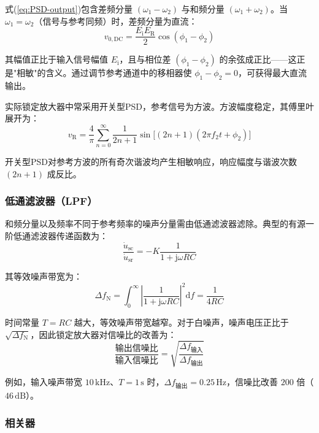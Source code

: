 式(\ref{eq:PSD-output})包含差频分量 $(\omega_{1} - \omega_{2})$ 与和频分量 $(\omega_{1} + \omega_{2})$。当 $\omega_{1} = \omega_{2}$（信号与参考同频）时，差频分量为直流：
\begin{equation}
v_{0,\mathrm{DC}} = \frac{E_{\mathrm{i}}E_{\mathrm{R}}}{2}\cos(\phi_{1} - \phi_{2})
\end{equation}

其幅值正比于输入信号幅值 $E_{\mathrm{i}}$，且与相位差 $(\phi_{1} - \phi_{2})$ 的余弦成正比——这正是"相敏"的含义。通过调节参考通道中的移相器使 $\phi_{1} - \phi_{2} = 0$，可获得最大直流输出。

实际锁定放大器中常采用开关型PSD，参考信号为方波。方波幅度稳定，其傅里叶展开为：
\begin{equation}
v_{\mathrm{R}} = \frac{4}{\pi}\sum_{n=0}^{\infty}\frac{1}{2n+1}\sin\big[(2n+1)(2\pi f_{2}t + \phi_{2})\big]
\end{equation}

开关型PSD对参考方波的所有奇次谐波均产生相敏响应，响应幅度与谐波次数 $(2n+1)$ 成反比。

\subsubsection{低通滤波器（LPF）}

和频分量以及频率不同于参考频率的噪声分量需由低通滤波器滤除。典型的有源一阶低通滤波器传递函数为：
\begin{equation}
\frac{\dot{u}_{\mathrm{sc}}}{\dot{u}_{\mathrm{sr}}} = -K\frac{1}{1 + \mathrm{j}\omega RC}
\end{equation}

其等效噪声带宽为：
\begin{equation}\label{eq:noise-bandwidth}
\Delta f_{\mathrm{N}} = \int_{0}^{\infty}\left|\frac{1}{1 + \mathrm{j}\omega RC}\right|^{2}\mathrm{d}f = \frac{1}{4RC}
\end{equation}

时间常量 $T = RC$ 越大，等效噪声带宽越窄。对于白噪声，噪声电压正比于 $\sqrt{\Delta f_{\mathrm{N}}}$，因此锁定放大器对信噪比的改善为：
\begin{equation}
\frac{\text{输出信噪比}}{\text{输入信噪比}} = \sqrt{\frac{\Delta f_{\text{输入}}}{\Delta f_{\text{输出}}}}
\end{equation}

例如，输入噪声带宽 $10\,\mathrm{kHz}$、$T = 1\,\mathrm{s}$ 时，$\Delta f_{\text{输出}} = 0.25\,\mathrm{Hz}$，信噪比改善 $200$ 倍（$46\,\mathrm{dB}$）。

\subsubsection{相关器}


